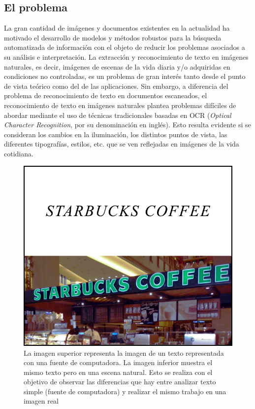 \subsection{El problema}

	La gran cantidad de imágenes y documentos existentes en la actualidad ha motivado el desarrollo de modelos y métodos robustos para la búsqueda automatizada de información con el objeto de reducir los problemas asociados a su análisis e interpretación. La extracción y reconocimiento de texto en imágenes naturales, es decir, imágenes de escenas de la vida diaria y/o adquiridas en condiciones no controladas, es un problema de gran interés tanto desde el punto de vista teórico como del de las aplicaciones.  Sin embargo, a diferencia del problema de reconocimiento de texto en documentos escaneados, el reconocimiento de texto en imágenes naturales plantea problemas difíciles de abordar mediante el uso de técnicas tradicionales basadas en OCR (\textit{Optical Character Recognition}, por su denominación en inglés). Esto resulta evidente si se consideran los cambios en la iluminación, los distintos puntos de vista, las diferentes tipografías, estilos, etc. que se ven reflejadas en imágenes de la vida cotidiana.
	
			\begin{figure}[htbp]
				\centering
				\centerline{
					\includegraphics[scale=0.3]{img/ocr_vs_naturalImg.jpg}
				}
				\caption[OCRvsNaturales]{La imagen superior representa la imagen de un texto representada con una fuente de computadora. La imagen inferior muestra el mismo texto pero en una escena natural. Esto se realiza con el objetivo de observar las diferencias que hay entre analizar texto simple (fuente de computadora) y realizar el mismo trabajo en una imagen real}
				\label{fig: Optophone}
			\end{figure}
			
